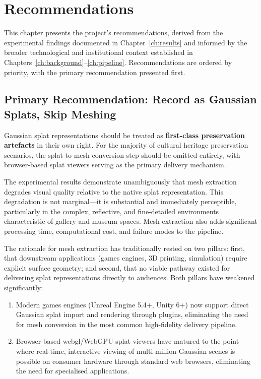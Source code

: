 \chapter{Recommendations}
\label{ch:recommendations}

This chapter presents the project's recommendations, derived from the experimental findings documented in Chapter~\ref{ch:results} and informed by the broader technological and institutional context established in Chapters~\ref{ch:background}--\ref{ch:pipeline}. Recommendations are ordered by priority, with the primary recommendation presented first.

\section{Primary Recommendation: Record as Gaussian Splats, Skip Meshing}
\label{sec:rec-primary}

\begin{recommendation}[title={Primary Recommendation}]
Gaussian splat representations should be treated as \textbf{first-class preservation artefacts} in their own right. For the majority of cultural heritage preservation scenarios, the splat-to-mesh conversion step should be omitted entirely, with browser-based splat viewers serving as the primary delivery mechanism.
\end{recommendation}

The experimental results demonstrate unambiguously that mesh extraction degrades visual quality relative to the native splat representation. This degradation is not marginal---it is substantial and immediately perceptible, particularly in the complex, reflective, and fine-detailed environments characteristic of gallery and museum spaces. Mesh extraction also adds significant processing time, computational cost, and failure modes to the pipeline.

The rationale for mesh extraction has traditionally rested on two pillars: first, that downstream applications (games engines, 3D printing, simulation) require explicit surface geometry; and second, that no viable pathway existed for delivering splat representations directly to audiences. Both pillars have weakened significantly:

\begin{enumerate}
  \item Modern games engines (Unreal Engine 5.4+, Unity 6+) now support direct Gaussian splat import and rendering through plugins, eliminating the need for mesh conversion in the most common high-fidelity delivery pipeline.

  \item Browser-based \acrshort{webgl}/WebGPU splat viewers have matured to the point where real-time, interactive viewing of multi-million-Gaussian scenes is possible on consumer hardware through standard web browsers, eliminating the need for specialised applications.
\end{enumerate}

